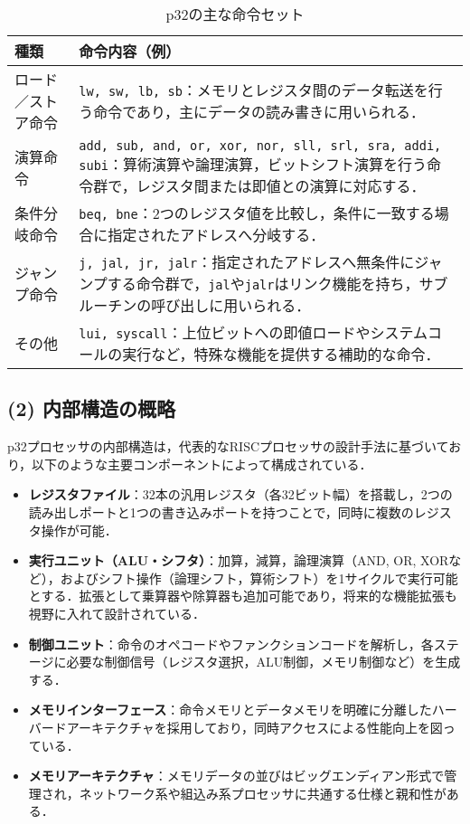 \documentclass[autodetect-engine,dvi=dvipdfmx,ja=standard,
               a4j,11pt]{bxjsarticle}
\begin{document}
\begin{table}[hbtp]
\centering
\caption{p32の主な命令セット}
\begin{tabularx}{\linewidth}{|l|X|}
\hline
種類 & 命令内容（例） \\
\hline
ロード／ストア命令 & \texttt{lw, sw, lb, sb}：メモリとレジスタ間のデータ転送を行う命令であり，主にデータの読み書きに用いられる． \\ 
\hline
演算命令 & \texttt{add, sub, and, or, xor, nor, sll, srl, sra, addi, subi}：算術演算や論理演算，ビットシフト演算を行う命令群で，レジスタ間または即値との演算に対応する． \\
\hline
条件分岐命令 & \texttt{beq, bne}：2つのレジスタ値を比較し，条件に一致する場合に指定されたアドレスへ分岐する． \\
\hline
ジャンプ命令 & \texttt{j, jal, jr, jalr}：指定されたアドレスへ無条件にジャンプする命令群で，\texttt{jal}や\texttt{jalr}はリンク機能を持ち，サブルーチンの呼び出しに用いられる． \\
\hline
その他 & \texttt{lui, syscall}：上位ビットへの即値ロードやシステムコールの実行など，特殊な機能を提供する補助的な命令． \\
\hline
\end{tabularx}
\end{table}

\subsection*{(2) 内部構造の概略}
p32プロセッサの内部構造は，代表的なRISCプロセッサの設計手法に基づいており，以下のような主要コンポーネントによって構成されている．

\begin{itemize}
\item \textbf{レジスタファイル}：32本の汎用レジスタ（各32ビット幅）を搭載し，2つの読み出しポートと1つの書き込みポートを持つことで，同時に複数のレジスタ操作が可能．
\item \textbf{実行ユニット（ALU・シフタ）}：加算，減算，論理演算（AND, OR, XORなど），およびシフト操作（論理シフト，算術シフト）を1サイクルで実行可能とする．拡張として乗算器や除算器も追加可能であり，将来的な機能拡張も視野に入れて設計されている．
\item \textbf{制御ユニット}：命令のオペコードやファンクションコードを解析し，各ステージに必要な制御信号（レジスタ選択，ALU制御，メモリ制御など）を生成する．
\item \textbf{メモリインターフェース}：命令メモリとデータメモリを明確に分離したハーバードアーキテクチャを採用しており，同時アクセスによる性能向上を図っている．
\item \textbf{メモリアーキテクチャ}：メモリデータの並びはビッグエンディアン形式で管理され，ネットワーク系や組込み系プロセッサに共通する仕様と親和性がある．
\end{itemize}
\end{document}
